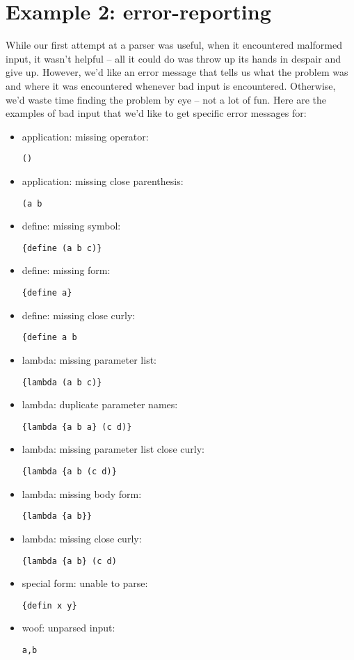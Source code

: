 \documentclass{tmr}
\begin{document}
\section{Example 2: error-reporting}
While our first attempt at a parser was useful, when it encountered malformed input, it wasn't
helpful -- all it could do was throw up its hands in despair and give up.  However, we'd like
an error message that tells us what the problem was and where it was encountered whenever bad
input is encountered.  Otherwise, we'd waste time finding the problem by eye -- not a lot of 
fun.  Here are the examples of bad input that we'd like to get specific error messages for:
\begin{itemize}
\item application: missing operator:  \begin{verbatim}()\end{verbatim}
\item application: missing close parenthesis:  \begin{verbatim}(a b\end{verbatim}
\item define: missing symbol:  \begin{verbatim}{define (a b c)}\end{verbatim}
\item define: missing form:  \begin{verbatim}{define a}\end{verbatim}
\item define: missing close curly:  \begin{verbatim}{define a b\end{verbatim}
\item lambda: missing parameter list:  \begin{verbatim}{lambda (a b c)}\end{verbatim}
\item lambda: duplicate parameter names:  \begin{verbatim}{lambda {a b a} (c d)}\end{verbatim}
\item lambda: missing parameter list close curly:  \begin{verbatim}{lambda {a b (c d)}\end{verbatim}
\item lambda: missing body form:  \begin{verbatim}{lambda {a b}}\end{verbatim}
\item lambda: missing close curly:  \begin{verbatim}{lambda {a b} (c d)\end{verbatim}
\item special form: unable to parse:  \begin{verbatim}{defin x y}\end{verbatim}
\item woof: unparsed input:  \begin{verbatim}a,b\end{verbatim}
\end{itemize}
\end{document}
